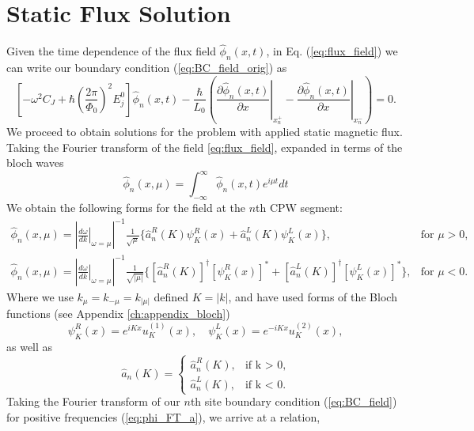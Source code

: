 \section{Static Flux Solution}\label{eq:Static_Flux}
%
Given the time dependence of the flux field $\hat{\phi}_n(x,t)$, in Eq. (\ref{eq:flux_field}) we can write our boundary condition (\ref{eq:BC_field_orig}) as
%
\begin{equation}\label{eq:BC_field}
\left[-\omega^2 C_{J}+\hbar\left(\frac{2 \pi}{\Phi_{0}}\right)^{2} E_{j}^0\right]\hat{\phi}_n(x,t) -\frac{\hbar}{L_{0}}\left(\left.\frac{\partial \hat{\phi}_n(x,t)}{\partial x}\right|_{x_n^{+}}-\left.\frac{\partial \hat{\phi}_n(x,t)}{\partial x}\right|_{x_n^{-}}\right)=0.
\end{equation}
%
We proceed to obtain solutions for the problem with applied static magnetic flux. Taking the Fourier transform of the field \ref{eq:flux_field}, expanded in terms of the bloch waves
\begin{equation}\label{eq:field_FT}
    \hat{\phi}_n(x, \mu) = \int_{-\infty}^\infty \hat{\phi}_n(x,t) e^{i\mu t} dt
\end{equation}
%
We obtain the following forms for the field at the $n$th CPW segment:
\begin{subequations} \label{eq:phi_FT}
\begin{eqnarray}
    \hat{\phi}_n(x, \mu) =  \left|\left.\frac{d\omega}{dk}\right|_{\omega=\mu}\right|^{-1}\frac{1}{\sqrt{\mu}}\biggl\lbrace \hat{a}_n^R(K) \psi^R_K(x) + \hat{a}_n^L(K)\psi_K^L(x)\biggr\rbrace, &\text{for } \mu > 0, \label{eq:phi_FT_a}\\
    \hat{\phi}_n(x, \mu) = \left|\left.\frac{d\omega}{dk}\right|_{\omega=\mu}\right|^{-1}\frac{1}{\sqrt{|\mu|}}\biggl\lbrace [\hat{a}^R_n(K)]^\dagger \left[\psi^R_K(x)\right]^* + [\hat{a}_n^L(K)]^\dagger\left[\psi_K^L(x)\right]^*\biggr\rbrace, &\text{for } \mu < 0. \label{eq:phi_FT_b}
\end{eqnarray}
\end{subequations}
%
Where we use $k_{\mu} = k_{-\mu} = k_{|\mu|}$ defined $K = |k|$, and have used forms of the Bloch functions (see Appendix \ref{ch:appendix_bloch})
%
\begin{equation}\label{eq:bloch_waves}
    \psi_{K}^R (x) =e^{iKx} u_{K}^{(1)}(x), \hspace{12pt}  \psi_{K}^L(x) =e^{-iKx} u_{K}^{(2)}(x),
\end{equation}
%
as well as 
\begin{equation}
    \hat{a}_n(K) = 
    \begin{cases}
    \hat{a}_n^R(K), &\text{if k > 0,}\\
    \hat{a}_n^L(K), &\text{if k < 0.}
    \end{cases}
\end{equation}
%
Taking the Fourier transform of our $n$th site boundary condition (\ref{eq:BC_field}) for positive frequencies (\ref{eq:phi_FT_a}), we arrive at a relation,

